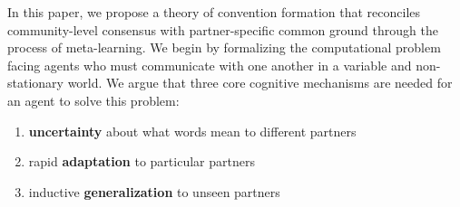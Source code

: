 In this paper, we propose a theory of convention formation that reconciles community-level consensus with partner-specific common ground through the process of meta-learning.
We begin by formalizing the computational problem facing agents who must communicate with one another in a variable and non-stationary world. 
We argue that three core cognitive mechanisms are needed for an agent to solve this problem: 
\begin{enumerate}
\item \textbf{uncertainty} about what words mean to different partners
\item rapid \textbf{adaptation} to particular partners
\item  inductive \textbf{generalization} to unseen partners
\end{enumerate}

